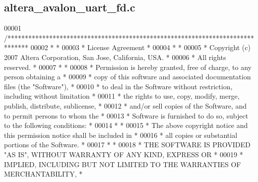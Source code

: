 \subsection{altera\+\_\+avalon\+\_\+uart\+\_\+fd.\+c}
\label{altera__avalon__uart__fd_8c_source}

\begin{DoxyCode}
00001 \textcolor{comment}{/******************************************************************************}
00002 \textcolor{comment}{*                                                                             *}
00003 \textcolor{comment}{* License Agreement                                                           *}
00004 \textcolor{comment}{*                                                                             *}
00005 \textcolor{comment}{* Copyright (c) 2007 Altera Corporation, San Jose, California, USA.           *}
00006 \textcolor{comment}{* All rights reserved.                                                        *}
00007 \textcolor{comment}{*                                                                             *}
00008 \textcolor{comment}{* Permission is hereby granted, free of charge, to any person obtaining a     *}
00009 \textcolor{comment}{* copy of this software and associated documentation files (the "Software"),  *}
00010 \textcolor{comment}{* to deal in the Software without restriction, including without limitation   *}
00011 \textcolor{comment}{* the rights to use, copy, modify, merge, publish, distribute, sublicense,    *}
00012 \textcolor{comment}{* and/or sell copies of the Software, and to permit persons to whom the       *}
00013 \textcolor{comment}{* Software is furnished to do so, subject to the following conditions:        *}
00014 \textcolor{comment}{*                                                                             *}
00015 \textcolor{comment}{* The above copyright notice and this permission notice shall be included in  *}
00016 \textcolor{comment}{* all copies or substantial portions of the Software.                         *}
00017 \textcolor{comment}{*                                                                             *}
00018 \textcolor{comment}{* THE SOFTWARE IS PROVIDED "AS IS", WITHOUT WARRANTY OF ANY KIND, EXPRESS OR  *}
00019 \textcolor{comment}{* IMPLIED, INCLUDING BUT NOT LIMITED TO THE WARRANTIES OF MERCHANTABILITY,    *}

\end{DoxyCode}
